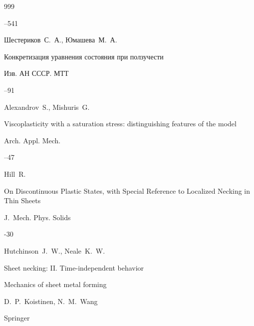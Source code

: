 \begin{thebibliography}{999}

–541






\by Шестериков~С.~А., Юмашева~М.~А.

\paper Конкретизация уравнения состояния при ползучести

\jour Изв. АН СССР. МТТ



--91




\by  Alexandrov~S., Mishuris~G.

\paper Viscoplasticity with a saturation stress: distinguishing features of the model

\jour Arch. Appl. Mech.




–47






\by  Hill~R. 

\paper On Discontinuous Plastic States, with Special Reference to Localized Necking in Thin Sheets

\jour J.~Mech. Phys. Solids




-30





\by Hutchinson~J.~W., Neale~K.~W.

\paper Sheet necking: II. Time-independent behavior

\inbook Mechanics of sheet metal forming 

\eds D.~P.~Koistinen, N.~M.~Wang 

\publ Springer


\end{thebibliography}

